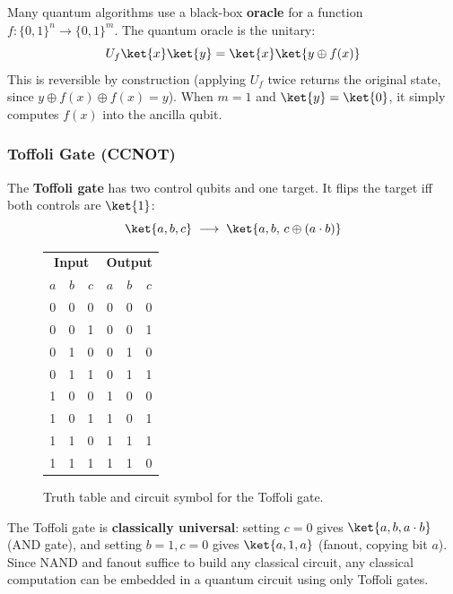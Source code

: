 \documentclass[oneside]{academica}
\begin{document}
Many quantum algorithms use a black-box \textbf{oracle} for a function $f:\{0,1\}^n\to\{0,1\}^m$.
The quantum oracle is the unitary:
\begin{equation*}
  U_f\ket{x}\ket{y}=\ket{x}\ket{y\oplus f(x)}
\end{equation*}
This is reversible by construction (applying $U_f$ twice returns the original state, since $y\oplus f(x)\oplus f(x)=y$).
When $m=1$ and $\ket{y}=\ket{0}$, it simply computes $f(x)$ into the ancilla qubit.

\subsubsection{Toffoli Gate (CCNOT)}

The \textbf{Toffoli gate} has two control qubits and one target.
It flips the target iff both controls are $\ket{1}$:
\begin{equation*}
  \ket{a,b,c}\;\longrightarrow\;\ket{a,b,\,c\oplus(a\cdot b)}
\end{equation*}

\begin{figure}[H]
  \begin{minipage}{0.48\textwidth}
    \centering
    \begin{tabular}{ccc|ccc}
      \multicolumn{3}{c}{\textbf{Input}} & \multicolumn{3}{c}{\textbf{Output}} \\
      $a$ & $b$ & $c$ & $a$ & $b$ & $c$ \\
      \hline
      0 & 0 & 0 & 0 & 0 & 0 \\
      0 & 0 & 1 & 0 & 0 & 1 \\
      0 & 1 & 0 & 0 & 1 & 0 \\
      0 & 1 & 1 & 0 & 1 & 1 \\
      1 & 0 & 0 & 1 & 0 & 0 \\
      1 & 0 & 1 & 1 & 0 & 1 \\
      1 & 1 & 0 & 1 & 1 & 1 \\
      1 & 1 & 1 & 1 & 1 & 0 \\
    \end{tabular}
  \end{minipage}
  \begin{minipage}{0.48\textwidth}
    \centering
    
  \end{minipage}
  \caption{Truth table and circuit symbol for the Toffoli gate.}
\end{figure}

The Toffoli gate is \textbf{classically universal}: setting $c=0$ gives $\ket{a,b,a\cdot b}$ (AND gate), and setting $b=1, c=0$ gives $\ket{a,1,a}$ (fanout, copying bit $a$).
Since NAND and fanout suffice to build any classical circuit, any classical computation can be embedded in a quantum circuit using only Toffoli gates.
\end{document}
